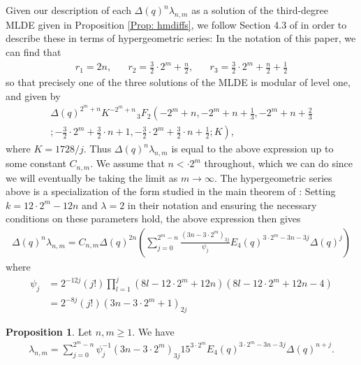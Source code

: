 \documentclass[10pt,a4paper]{amsart}
\numberwithin{equation}{section}
\theoremstyle{definition}
\newtheorem{Prop}[Th]{Proposition}
\newcommand{\haupt}{\lambda}
\begin{document}
Given our description of each $\Delta (q)^{n} \haupt_{n,m}$ as a solution of the third-degree MLDE given in Proposition \ref{Prop: hmdiffs}, we follow Section 4.3 of \cite{FM16} in order to describe these in terms of hypergeometric series: In the notation of this paper, we can find that
\begin{align*}
    r_{1} = 2n, \hspace{20pt} r_{2} = \frac{3}{2} \cdot 2^{m} + \frac{n}{2}, \hspace{20pt} r_{3} = \frac{3}{2} \cdot 2^{m} + \frac{n}{2} + \frac{1}{2}
\end{align*}
so that precisely one of the three solutions of the MLDE is modular of level one, and given by
\begin{multline*}
    \Delta (q)^{2^{m}+n} K^{-2^{m}+n} \hspace{1pt} _{3}F_{2} \left( - 2^{m}+n,- 2^{m}+n +\tfrac{1}{3}, - 2^{m}+n+\tfrac{2}{3} \right. \\  \left. ; -\tfrac{3}{2}\cdot 2^{m} + \tfrac{3}{2}\cdot n + 1, -\tfrac{3}{2} \cdot 2^{m} + \tfrac{3}{2} \cdot n + \tfrac{1}{2} ; K \right),
\end{multline*}
where $K=1728/j$. Thus $\Delta (q)^{n} \haupt_{n,m}$ is equal to the above expression up to some constant $C_{n,m}$. We assume that $n < \cdot 2^{m}$ throughout, which we can do since we will eventually be taking the limit as $m \to \infty$. The hypergeometric series above is a specialization of the form studied in the main theorem of \cite{KT01}: Setting $k = 12 \cdot 2^{m} - 12n$ and $\lambda = 2$ in their notation and ensuring the necessary conditions on these parameters hold, the above expression then gives
\begin{align}
    \Delta (q)^{n}\haupt_{n,m} = C_{n,m}\Delta (q)^{2n} \left( \sum_{j=0}^{2^{m}-n} \frac{(3n- 3 \cdot 2^{m})_{3j}}{\psi_{j}} E_{4}(q)^{3 \cdot 2^{m} - 3n - 3j} \Delta (q)^{j} \right) \label{prehmns}
\end{align}
where
\begin{align}
   \psi_{j} &= 2^{-12j} (j!) \prod_{l=1}^{j} \left( 8l-12\cdot 2^{m} + 12n \right) \left( 8l-12 \cdot 2^{m} + 12n-4 \right) \nonumber \\
    &= 2^{-8j} (j!) (3n-3\cdot 2^{m}+1)_{2j} \label{psicoeff}
\end{align}
\begin{Prop} \label{Prop: hmnseisenstein}
    Let $n,m \geq 1$. We have
    \begin{align*}
    \haupt_{n,m} = \sum_{j=0}^{2^{m}-n} \psi_{j}^{-1} \left( 3n-3 \cdot 2^{m} \right)_{3j} 15^{3 \cdot 2^{m}} E_{4}(q)^{3 \cdot 2^{m} - 3n - 3j} \Delta (q)^{n+j}.
\end{align*}
\end{Prop}
\end{document}
